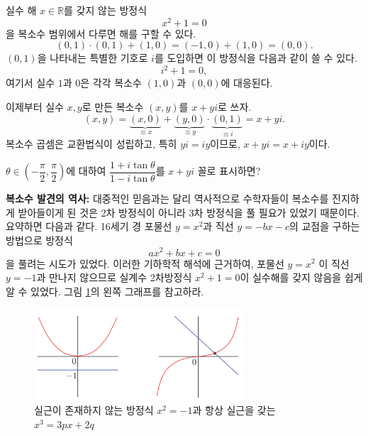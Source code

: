 실수 해 $x\in\mathbb R$를 갖지 않는 방정식
$$
x^2+1=0
$$
을 복소수 범위에서 다루면 해를 구할 수 있다.
$$
(0,1)\cdot (0,1) + (1,0) = (-1,0) + (1,0) = (0,0).
$$
$(0,1)$을 나타내는 특별한 기호로 $i$를 도입하면 이 방정식을 다음과 같이 쓸 수 있다.
$$
i^2+1=0,
$$
여기서 실수 $1$과 $0$은 각각 복소수 $(1,0)$과 $(0,0)$에 대응된다.

이제부터 실수  $x,y$로 만든 복소수 $(x,y)$를 $x+yi$로 쓰자.
$$
(x,y) = \underbrace{(x,0)}_{\equiv x} +  \underbrace{(y,0)}_{\equiv y}
\cdot  \underbrace{(0,1)}_{\equiv i} = x+yi.
$$
복소수 곱셈은 교환법식이 성립하고, 특히 $yi = iy$이므로,
$x+yi = x+iy$이다.

\begin{salt_exercise} \label{ex-1-2}
$\theta \in \left(-\dfrac{\pi}2, \dfrac\pi2 \right)$에 대하여
$\dfrac{1+i\tan\theta}{1-i\tan\theta}$를 $x+yi$ 꼴로 표시하면?
\end{salt_exercise}

{\bf 복소수 발견의 역사: }
대중적인 믿음과는 달리 역사적으로 수학자들이 복소수를 진지하게 받아들이게 된 것은 
2차 방정식이 아니라 3차 방정식을 풀 필요가 있었기 때문이다. 
요약하면 다음과 같다.
16세기 경 포물선 $y=x^2$과 직선 $y=-bx-c$의 교점을 구하는  방법으로 
 방정식
$$
ax^2 + bx + c = 0
$$
을 풀려는 시도가 있었다. 
이러한 기하학적 해석에 근거하여,
포물선  $y=x^2$ 이 직선 $y=-1$과 만나지 않으므로
실계수 2차방정식 $x^2+1=0$이 실수해를 갖지 않음을 쉽게 알 수 있었다.
그림 \ref{fig-1-1}의 왼쪽 그래프를 참고하라.

\begin{figure}[!h]
\begin{center}
\includegraphics[width=0.7\textwidth]{./SaltChapter/figs/fig-1-1}
\end{center}
\caption{실근이 존재하지 않는 방정식 $x^2=-1$과 항상 실근을 갖는 $x^3=3px+2q$}
\label{fig-1-1}
\end{figure}

